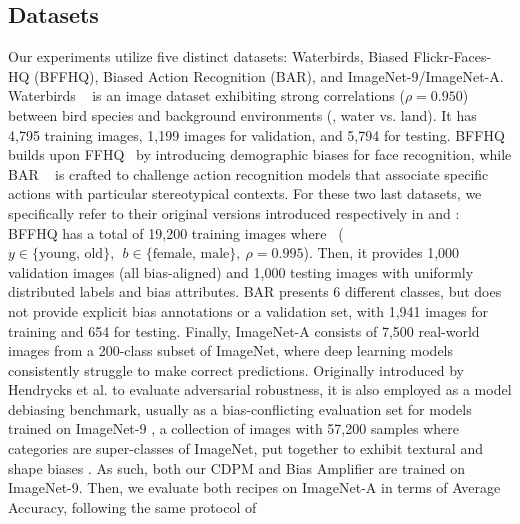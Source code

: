\subsection{Datasets}
Our experiments utilize five distinct datasets:  Waterbirds, Biased Flickr-Faces-HQ (BFFHQ), Biased Action Recognition (BAR), and ImageNet-9/ImageNet-A.
Waterbirds ~\cite{Sagawa*2020Distributionally} is an image dataset exhibiting strong correlations ({$\rho = 0.950$}) between bird species and background environments (\eg, water vs. land). It has 4,795 training images, 1,199 images for validation, and 5,794 for testing.
BFFHQ~\cite{kim2021biaswap} builds upon FFHQ~\cite{DBLP:journals/pami/KarrasLA21} by introducing demographic biases for face recognition, while BAR ~\cite{nam2020learning} is crafted to challenge action recognition models that associate specific actions with particular stereotypical contexts. For these two last datasets, we specifically refer to their original versions introduced respectively in \cite{nam2020learning} and \cite{kim2021biaswap}: BFFHQ has a total of 19,200 training images where ~(~{$y \in \lbrace\text{young, old}\rbrace,~~ b \in \lbrace\text{female, male}\rbrace, ~\rho = 0.995$)}. Then, it provides 1,000 validation images (all bias-aligned) and 1,000 testing images with uniformly distributed labels and bias attributes. BAR presents 6 different classes, but does not provide explicit bias annotations or a validation set, with 1,941 images for training and 654 for testing.
Finally, ImageNet-A consists of 7,500 real-world images from a 200-class subset of ImageNet, where deep learning models consistently struggle to make correct predictions. Originally introduced by Hendrycks et al. \cite{hendrycks2021natural} to evaluate adversarial robustness, it is also employed as a model debiasing benchmark, usually as a bias-conflicting evaluation set for models trained on ImageNet-9 \cite{bahng2019rebias}, a collection of images with 57,200 samples where categories are super-classes of ImageNet, put together to exhibit textural and shape biases \cite{bahng2019rebias}. As such, both our CDPM and Bias Amplifier are trained on ImageNet-9. Then, we evaluate both recipes on ImageNet-A in terms of Average Accuracy, following the same protocol of \cite{bahng2019rebias,NEURIPS2022_75004615_LWBC,nahon2023mining}


